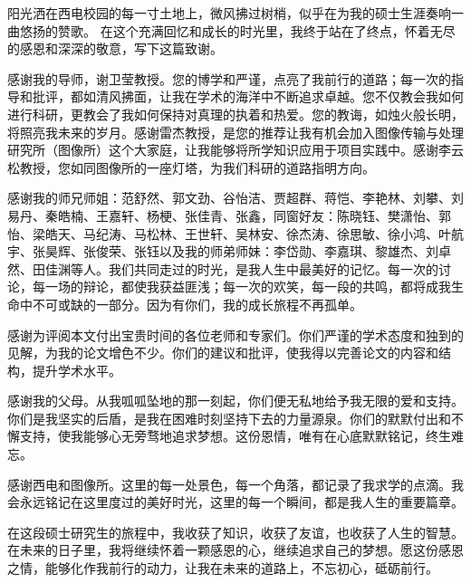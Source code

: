 
阳光洒在西电校园的每一寸土地上，微风拂过树梢，似乎在为我的硕士生涯奏响一曲悠扬的赞歌。
在这个充满回忆和成长的时光里，我终于站在了终点，怀着无尽的感恩和深深的敬意，写下这篇致谢。

感谢我的导师，谢卫莹教授。您的博学和严谨，点亮了我前行的道路；每一次的指导和批评，都如清风拂面，让我在学术的海洋中不断追求卓越。您不仅教会我如何进行科研，更教会了我如何保持对真理的执着和热爱。您的教诲，如烛火般长明，将照亮我未来的岁月。感谢雷杰教授，是您的推荐让我有机会加入图像传输与处理研究所（图像所）这个大家庭，让我能够将所学知识应用于项目实践中。感谢李云松教授，您如同图像所的一座灯塔，为我们科研的道路指明方向。

感谢我的师兄师姐：范舒然、郭文劲、谷怡洁、贾超群、蒋恺、李艳林、刘攀、刘易丹、秦皓楠、王嘉轩、杨梗、张佳青、张鑫，同窗好友：陈晓钰、樊潇怡、郭怡、梁皓天、马纪涛、马松林、王世轩、吴林安、徐杰涛、徐思敏、徐小鸿、叶航宇、张昊辉、张俊荣、张钰以及我的师弟师妹：李岱勋、李嘉琪、黎雄杰、刘卓然、田佳渊等人。我们共同走过的时光，是我人生中最美好的记忆。每一次的讨论，每一场的辩论，都使我获益匪浅；每一次的欢笑，每一段的共鸣，都将成我生命中不可或缺的一部分。因为有你们，我的成长旅程不再孤单。

感谢为评阅本文付出宝贵时间的各位老师和专家们。你们严谨的学术态度和独到的见解，为我的论文增色不少。你们的建议和批评，使我得以完善论文的内容和结构，提升学术水平。

感谢我的父母。从我呱呱坠地的那一刻起，你们便无私地给予我无限的爱和支持。你们是我坚实的后盾，是我在困难时刻坚持下去的力量源泉。你们的默默付出和不懈支持，使我能够心无旁骛地追求梦想。这份恩情，唯有在心底默默铭记，终生难忘。

感谢西电和图像所。这里的每一处景色，每一个角落，都记录了我求学的点滴。我会永远铭记在这里度过的美好时光，这里的每一个瞬间，都是我人生的重要篇章。

在这段硕士研究生的旅程中，我收获了知识，收获了友谊，也收获了人生的智慧。在未来的日子里，我将继续怀着一颗感恩的心，继续追求自己的梦想。愿这份感恩之情，能够化作我前行的动力，让我在未来的道路上，不忘初心，砥砺前行。
